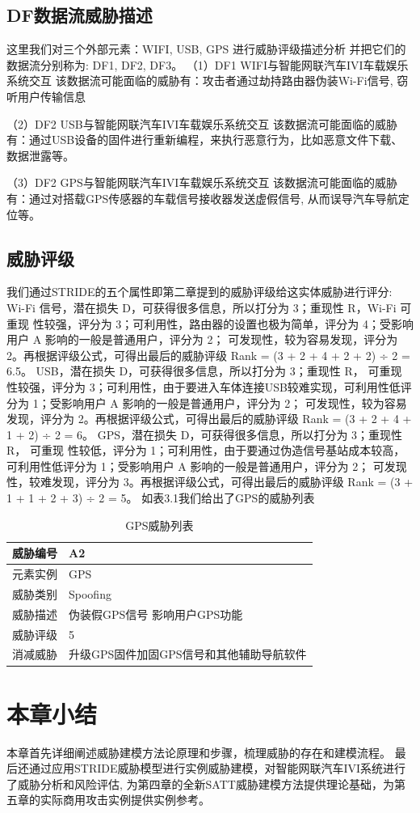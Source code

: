 \subsection{DF数据流威胁描述}
这里我们对三个外部元素：WIFI, USB, GPS 进行威胁评级描述分析
并把它们的数据流分别称为: DF1, DF2, DF3。
\newline
（1）DF1 WIFI与智能网联汽车IVI车载娱乐系统交互
该数据流可能面临的威胁有：攻击者通过劫持路由器伪装Wi-Fi信号, 窃听用户传输信息\cite{berghel2005wifi}

（2）DF2 USB与智能网联汽车IVI车载娱乐系统交互
该数据流可能面临的威胁有：通过USB设备的固件进行重新编程，来执行恶意行为，比如恶意文件下载、数据泄露等\cite{nissim2017usb}。

（3）DF2 GPS与智能网联汽车IVI车载娱乐系统交互
该数据流可能面临的威胁有：通过对搭载GPS传感器的车载信号接收器发送虚假信号, 从而误导汽车导航定位等\cite{alamleh2020cheat}。
\subsection{威胁评级}
我们通过STRIDE的五个属性即第二章提到的威胁评级给这实体威胁进行评分:
Wi-Fi 信号，潜在损失 D，可获得很多信息，所以打分为 3；重现性 R，Wi-Fi 可重现
性较强，评分为 3；可利用性，路由器的设置也极为简单，评分为 4；受影响用户 A 影响的一般是普通用户，评分为 2；
可发现性，较为容易发现，评分为 2。再根据评级公式，可得出最后的威胁评级 Rank = (3 + 2 + 4 + 2 + 2) ÷ 2 = 6.5。
USB，潜在损失 D，可获得很多信息，所以打分为 3；重现性 R， 可重现
性较强，评分为 3；可利用性，由于要进入车体连接USB较难实现，可利用性低评分为 1；受影响用户 A 影响的一般是普通用户，评分为 2；
可发现性，较为容易发现，评分为 2。再根据评级公式，可得出最后的威胁评级 Rank = (3 + 2 + 4 + 1 + 2) ÷ 2 = 6。
GPS，潜在损失 D，可获得很多信息，所以打分为 3；重现性 R， 可重现
性较低，评分为 1；可利用性，由于要通过伪造信号基站成本较高，可利用性低评分为 1；受影响用户 A 影响的一般是普通用户，评分为 2；
可发现性，较难发现，评分为 3。再根据评级公式，可得出最后的威胁评级 Rank = (3 + 1 + 1 + 2 + 3) ÷ 2 = 5。
如表3.1我们给出了GPS的威胁列表
\begin{table}
  \caption{GPS威胁列表}
\begin{center}
    \begin{tabular}{|l|l}
      \hline 威胁编号 & A2 \\
      \hline 元素实例 & GPS \\
      \hline 威胁类别 & Spoofing \\
      \hline 威胁描述 & 伪装假GPS信号 影响用户GPS功能 \\
      \hline 威胁评级 & 5 \\
      \hline 消减威胁 & 升级GPS固件加固GPS信号和其他辅助导航软件 \\
      \hline
      \end{tabular}
  \end{center}
\end{table}


\section{本章小结}
本章首先详细阐述威胁建模方法论原理和步骤，梳理威胁的存在和建模流程。
最后还通过应用STRIDE威胁模型进行实例威胁建模，对智能网联汽车IVI系统进行了威胁分析和风险评估,
为第四章的全新SATT威胁建模方法提供理论基础，为第五章的实际商用攻击实例提供实例参考。